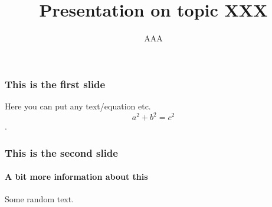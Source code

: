 \documentclass[10pt]{beamer}
\title{Presentation on  topic XXX}
\author{AAA}
\begin{document}
   \maketitle
	\begin{frame}
		\frametitle{This is the first slide}
		Here you can put any text/equation etc. 
		$$a^2 + b^2 = c^2$$.
	\end{frame}
	\begin{frame}
		\frametitle{This is the second slide}
		\framesubtitle{A bit more information about this}
		Some random text.		
	\end{frame}
\end{document}
